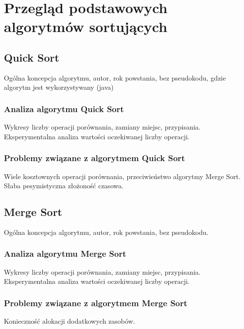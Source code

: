 \chapter{Przegląd podstawowych algorytmów sortujących}
\thispagestyle{chapterBeginStyle}


\section{Quick Sort}
Ogólna koncepcja algorytmu, autor, rok powstania, bez pseudokodu, gdzie algorytm jest wykorzystywany
(java)



\subsection{Analiza algorytmu Quick Sort}
Wykresy liczby operacji porównania, zamiany miejsc, przypisania. Eksperymentalna analiza wartości
oczekiwanej liczby operacji.

\subsection{Problemy związane z algorytmem Quick Sort}
Wiele kosztownych operacji porównania, przeciwieństwo algorytmy Merge Sort.
Słaba pesymistyczna złożoność czasowa.

\section{Merge Sort}
Ogólna koncepcja algorytmu, autor, rok powstania, bez pseudokodu.

\subsection{Analiza algorytmu Merge Sort}
Wykresy liczby operacji porównania, zamiany miejsc, przypisania. Eksperymentalna analiza wartości
oczekiwanej liczby operacji.


\subsection{Problemy związane z algorytmem Merge Sort}
Konieczność alokacji dodatkowych zasobów.